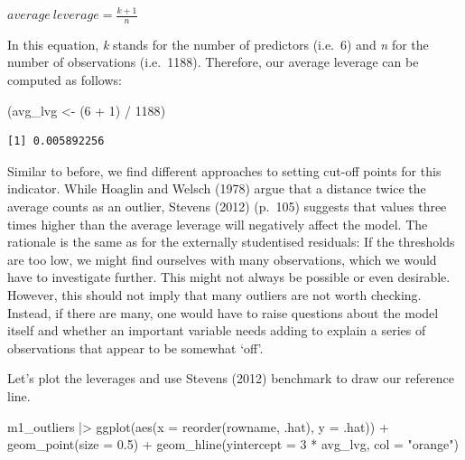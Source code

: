 \documentclass[
  letterpaper,
  DIV=11,
  numbers=noendperiod]{scrreprt}
\newenvironment{Shaded}{\begin{snugshade}}{\end{snugshade}}
\newcommand{\AttributeTok}[1]{\textcolor[rgb]{0.40,0.45,0.13}{#1}}
\newcommand{\DecValTok}[1]{\textcolor[rgb]{0.68,0.00,0.00}{#1}}
\newcommand{\FloatTok}[1]{\textcolor[rgb]{0.68,0.00,0.00}{#1}}
\newcommand{\FunctionTok}[1]{\textcolor[rgb]{0.28,0.35,0.67}{#1}}
\newcommand{\NormalTok}[1]{\textcolor[rgb]{0.00,0.23,0.31}{#1}}
\newcommand{\OtherTok}[1]{\textcolor[rgb]{0.00,0.23,0.31}{#1}}
\newcommand{\SpecialCharTok}[1]{\textcolor[rgb]{0.37,0.37,0.37}{#1}}
\newcommand{\StringTok}[1]{\textcolor[rgb]{0.13,0.47,0.30}{#1}}
\begin{document}
\label{average-leverage-equation}
\(average\ leverage = \frac{k + 1}{n}\)

In this equation, \emph{k} stands for the number of predictors (i.e.~6)
and \emph{n} for the number of observations (i.e.~1188). Therefore, our
average leverage can be computed as follows:

\begin{Shaded}
\begin{Highlighting}[]
\NormalTok{(avg\_lvg }\OtherTok{\textless{}{-}}\NormalTok{ (}\DecValTok{6} \SpecialCharTok{+} \DecValTok{1}\NormalTok{) }\SpecialCharTok{/} \DecValTok{1188}\NormalTok{)}
\end{Highlighting}
\end{Shaded}

\begin{verbatim}
[1] 0.005892256
\end{verbatim}

Similar to before, we find different approaches to setting cut-off
points for this indicator. While Hoaglin and Welsch (1978) argue that a
distance twice the average counts as an outlier, Stevens (2012) (p.~105)
suggests that values three times higher than the average leverage will
negatively affect the model. The rationale is the same as for the
externally studentised residuals: If the thresholds are too low, we
might find ourselves with many observations, which we would have to
investigate further. This might not always be possible or even
desirable. However, this should not imply that many outliers are not
worth checking. Instead, if there are many, one would have to raise
questions about the model itself and whether an important variable needs
adding to explain a series of observations that appear to be somewhat
`off'.

Let's plot the leverages and use Stevens (2012) benchmark to draw our
reference line.

\begin{Shaded}
\begin{Highlighting}[]
\NormalTok{m1\_outliers }\SpecialCharTok{|\textgreater{}}
  \FunctionTok{ggplot}\NormalTok{(}\FunctionTok{aes}\NormalTok{(}\AttributeTok{x =} \FunctionTok{reorder}\NormalTok{(rowname, .hat),}
             \AttributeTok{y =}\NormalTok{ .hat)) }\SpecialCharTok{+}
  \FunctionTok{geom\_point}\NormalTok{(}\AttributeTok{size =} \FloatTok{0.5}\NormalTok{) }\SpecialCharTok{+}
  \FunctionTok{geom\_hline}\NormalTok{(}\AttributeTok{yintercept =} \DecValTok{3} \SpecialCharTok{*}\NormalTok{ avg\_lvg, }\AttributeTok{col =} \StringTok{"orange"}\NormalTok{)}
\end{Highlighting}
\end{Shaded}
\end{document}
